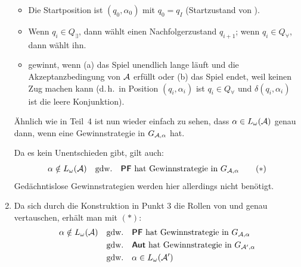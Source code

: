\documentclass[fontsize=11pt, twoside=false, numbers=autoenddot]{scrbook}
\begin{document}
\begin{enumerate}
\begin{itemize}
      \item
        Die Startposition ist $(q_0,\alpha_0)$ mit $q_0 = q_I$ (Startzustand von \Amc).
      \item 
        Wenn $q_i \in Q_\exists$, dann wählt \AUT einen Nachfolgerzustand $q_{i+1}$;
        wenn $q_i \in Q_\forall$, dann wählt \PF ihn.
      \item
        \AUT gewinnt, wenn (a) das Spiel unendlich lange läuft
        und die Akzeptanzbedingung von $\mathcal{A}$ erfüllt
        oder (b) das Spiel endet, weil \PF keinen Zug machen kann
        (d.\,h.\ in Position $(q_i,\alpha_i)$ ist $q_i \in Q_\forall$
        und $\delta(q_i,\alpha_i)$ ist die leere Konjunktion).
    \end{itemize}
    Ähnlich wie in Teil~4 ist nun wieder einfach zu sehen,
    dass $\alpha \in L_\omega(\mathcal{A})$ genau dann, wenn \AUT eine
    Gewinnstrategie in $G_{\mathcal{A},\alpha}$ hat.
    
    Da es kein Unentschieden gibt, gilt auch:
    \[
      \alpha \notin L_\omega(\Amc)
      \quad\text{gdw.}\quad
      \PF \text{~hat Gewinnstrategie in~} G_{\Amc,\alpha}
      \tag{$*$}
    \]
    Gedächntislose Gewinnstrategien werden hier allerdings nicht benötigt.
  \item
    Da sich durch die Konstruktion in Punkt 3 die Rollen von \AUT
    und \PF genau vertauschen, erhält man mit $(*)$:
    \begin{align*}
      \alpha \notin L_\omega(\Amc)
      & \quad\text{gdw.}\quad
        \PF \text{~hat Gewinnstrategie in~} G_{\Amc,\alpha} \\
      & \quad\text{gdw.}\quad
        \AUT \text{~hat Gewinnstrategie in~} G_{\Amc',\alpha} \\
      & \quad\text{gdw.}\quad
        \alpha \in L_\omega(\Amc')
    \end{align*}
    
\end{enumerate}
\end{document}
